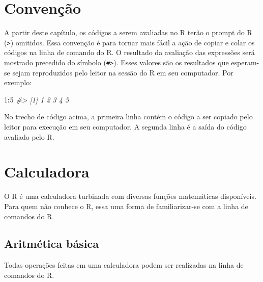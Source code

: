 \documentclass[]{book}
\newenvironment{Shaded}{\begin{snugshade}}{\end{snugshade}}
\newcommand{\DecValTok}[1]{\textcolor[rgb]{0.00,0.00,0.81}{#1}}
\newcommand{\FloatTok}[1]{\textcolor[rgb]{0.00,0.00,0.81}{#1}}
\newcommand{\StringTok}[1]{\textcolor[rgb]{0.31,0.60,0.02}{#1}}
\newcommand{\CommentTok}[1]{\textcolor[rgb]{0.56,0.35,0.01}{\textit{#1}}}
\newcommand{\OperatorTok}[1]{\textcolor[rgb]{0.81,0.36,0.00}{\textbf{#1}}}
\newcommand{\NormalTok}[1]{#1}
\begin{document}
\section{Convenção}\label{convencao}

A partir deste capítulo, os códigos a serem avaliadas no {R} terão o
prompt do {R} (\texttt{\textgreater{}}) omitidos. Essa convenção é para
tornar mais fácil a ação de copiar e colar os códigos na linha de
comando do {R}. O resultado da avaliação das expressões será mostrado
precedido do símbolo (\texttt{\#\textgreater{}}). Esses valores são os
resultados que esperam-se sejam reproduzidos pelo leitor na sessão do
{R} em seu computador. Por exemplo:

\begin{Shaded}
\begin{Highlighting}[]
\DecValTok{1}\OperatorTok{:}\DecValTok{5}
\CommentTok{#> [1] 1 2 3 4 5}
\end{Highlighting}
\end{Shaded}

No trecho de código acima, a primeira linha contém o código a ser
copiado pelo leitor para execução em seu computador. A segunda linha é a
saída do código avaliado pelo R.

\section{Calculadora}\label{calculadora}

O R é uma calculadora turbinada com diversas funções matemáticas
disponíveis. Para quem não conhece o R, essa uma forma de
familiarizar-se com a linha de comandos do R.

\subsection{Aritmética básica}\label{aritmetica-basica}

Todas operações feitas em uma calculadora podem ser realizadas na linha
de comandos do R.

\begin{Shaded}
\end{Shaded}
\end{document}
